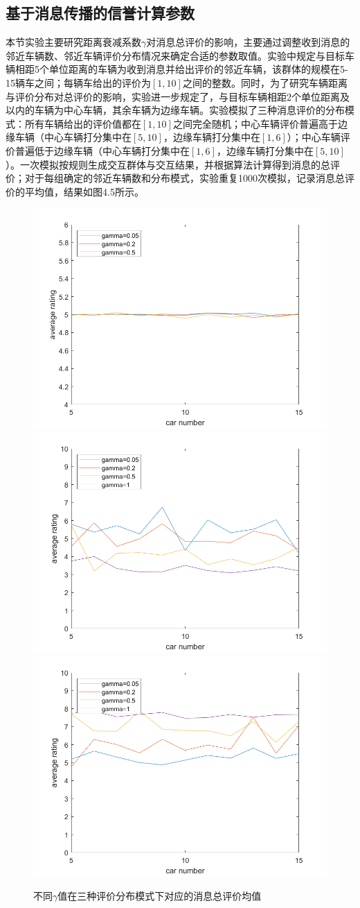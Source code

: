 \subsection{基于消息传播的信誉计算参数}
本节实验主要研究距离衰减系数$\gamma$对消息总评价的影响，主要通过调整收到消息的邻近车辆数、邻近车辆评价分布情况来确定合适的参数取值。实验中规定与目标车辆相距5个单位距离的车辆为收到消息并给出评价的邻近车辆，该群体的规模在5-15辆车之间；每辆车给出的评价为$[1,10]$之间的整数。同时，为了研究车辆距离与评价分布对总评价的影响，实验进一步规定了，与目标车辆相距2个单位距离及以内的车辆为中心车辆，其余车辆为边缘车辆。实验模拟了三种消息评价的分布模式：所有车辆给出的评价值都在$[1,10]$之间完全随机；中心车辆评价普遍高于边缘车辆（中心车辆打分集中在$[5,10]$，边缘车辆打分集中在$[1,6]$）；中心车辆评价普遍低于边缘车辆（中心车辆打分集中在$[1,6]$，边缘车辆打分集中在$[5,10]$）。一次模拟按规则生成交互群体与交互结果，并根据算法计算得到消息的总评价；对于每组确定的邻近车辆数和分布模式，实验重复1000次模拟，记录消息总评价的平均值，结果如图4.5所示。

\begin{figure}
  \centering
    {\includegraphics[width=0.49\linewidth]{figures/gamma_random.png}}
    {\includegraphics[width=0.49\linewidth]{figures/gamma_centerhi.png}}
    {\includegraphics[width=0.49\linewidth]{figures/gamma_centerlo.png}}
  \caption{不同$\gamma$值在三种评价分布模式下对应的消息总评价均值}
  \label{fig:gamma}
\end{figure}


